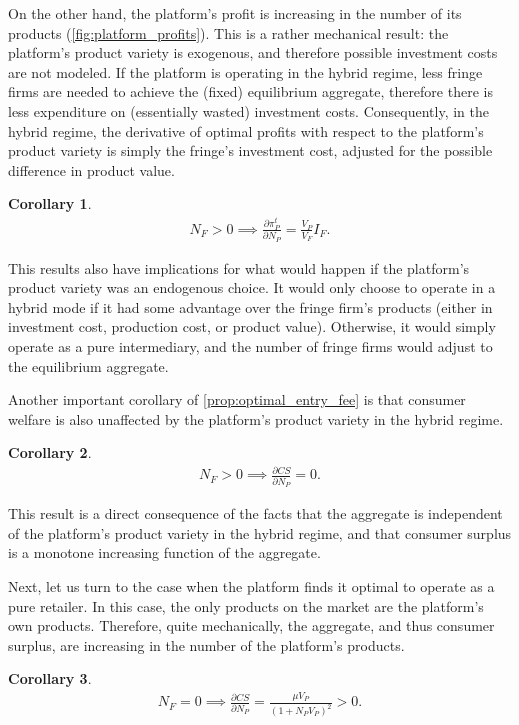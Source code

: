 \documentclass[a4paper]{article}
\newtheorem{corollary}{Corollary}
\begin{document}
On the other hand, the platform's profit is increasing in the number of its products (\cref{fig:platform_profits}).
This is a rather mechanical result: the platform's product variety is exogenous, and therefore possible investment costs are not modeled.
If the platform is operating in the hybrid regime, less fringe firms are needed to achieve the (fixed) equilibrium aggregate, therefore there is less expenditure on (essentially wasted) investment costs.
Consequently, in the hybrid regime, the derivative of optimal profits with respect to the platform's product variety is simply the fringe's investment cost, adjusted for the possible difference in product value.
\begin{corollary}
    \begin{align*}
        N_F > 0 \implies \frac{\partial \pi_P^t}{\partial N_P} = \frac{V_P}{V_F} I_F.
    \end{align*}
\end{corollary}
This results also have implications for what would happen if the platform's product variety was an endogenous choice.
It would only choose to operate in a hybrid mode if it had some advantage over the fringe firm's products (either in investment cost, production cost, or product value).
Otherwise, it would simply operate as a pure intermediary, and the number of fringe firms would adjust to the equilibrium aggregate.

Another important corollary of \cref{prop:optimal_entry_fee} is that consumer welfare is also unaffected by the platform's product variety in the hybrid regime.
\begin{corollary}
    \begin{align*}
        N_F > 0 \implies \frac{\partial CS}{\partial N_P} = 0.
    \end{align*}
\end{corollary}
This result is a direct consequence of the facts that the aggregate is independent of the platform's product variety in the hybrid regime, and that consumer surplus is a monotone increasing function of the aggregate.

Next, let us turn to the case when the platform finds it optimal to operate as a pure retailer.
In this case, the only products on the market are the platform's own products.
Therefore, quite mechanically, the aggregate, and thus consumer surplus, are increasing in the number of the platform's products.
\begin{corollary}
    \begin{align*}
        N_F = 0 \implies \frac{\partial CS}{\partial N_P} = \frac{\mu V_P}{(1 + N_P V_P)^2} > 0.
    \end{align*}
\end{corollary}
\end{document}
